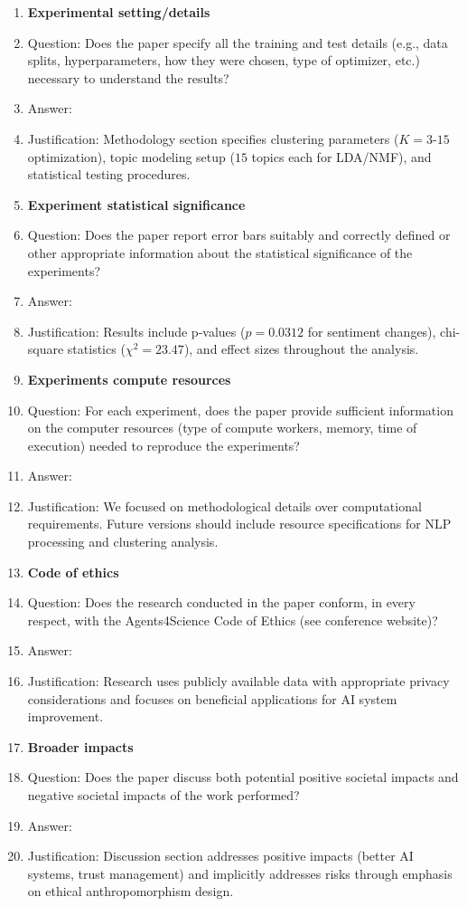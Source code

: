 \documentclass{article}
\begin{document}
\begin{enumerate}
\item {\bf Experimental setting/details}
    \item[] Question: Does the paper specify all the training and test details (e.g., data splits, hyperparameters, how they were chosen, type of optimizer, etc.) necessary to understand the results?
    \item[] Answer: \answerYes{} 
    \item[] Justification: Methodology section specifies clustering parameters ($K=3$-$15$ optimization), topic modeling setup ($15$ topics each for LDA/NMF), and statistical testing procedures.

\item {\bf Experiment statistical significance}
    \item[] Question: Does the paper report error bars suitably and correctly defined or other appropriate information about the statistical significance of the experiments?
    \item[] Answer: \answerYes{} 
    \item[] Justification: Results include p-values ($p=0.0312$ for sentiment changes), chi-square statistics ($\chi^2=23.47$), and effect sizes throughout the analysis.

\item {\bf Experiments compute resources}
    \item[] Question: For each experiment, does the paper provide sufficient information on the computer resources (type of compute workers, memory, time of execution) needed to reproduce the experiments?
    \item[] Answer: \answerNo{} 
    \item[] Justification: We focused on methodological details over computational requirements. Future versions should include resource specifications for NLP processing and clustering analysis.

\item {\bf Code of ethics}
    \item[] Question: Does the research conducted in the paper conform, in every respect, with the Agents4Science Code of Ethics (see conference website)?
    \item[] Answer: \answerYes{} 
    \item[] Justification: Research uses publicly available data with appropriate privacy considerations and focuses on beneficial applications for AI system improvement.

\item {\bf Broader impacts}
    \item[] Question: Does the paper discuss both potential positive societal impacts and negative societal impacts of the work performed?
    \item[] Answer: \answerYes{} 
    \item[] Justification: Discussion section addresses positive impacts (better AI systems, trust management) and implicitly addresses risks through emphasis on ethical anthropomorphism design.

\end{enumerate}
\end{document}
